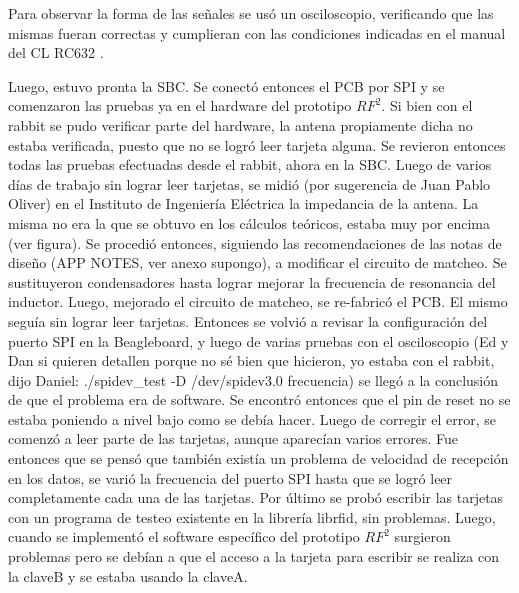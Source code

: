 Para observar la forma de las señales se usó un osciloscopio, verificando que las mismas fueran correctas y cumplieran con las condiciones indicadas en el manual del CL RC632 .

Luego, estuvo pronta la SBC. Se conectó entonces el PCB por SPI y se comenzaron las pruebas ya en el hardware del prototipo ${RF^{2}}$. Si bien con el rabbit se pudo verificar parte del hardware, la antena propiamente dicha no estaba verificada, puesto que no se logró leer tarjeta alguna.
Se revieron entonces todas las pruebas efectuadas desde el rabbit, ahora en la SBC. Luego de varios días de trabajo sin lograr leer tarjetas, se midió (por sugerencia de Juan Pablo Oliver) en el Instituto de Ingeniería Eléctrica la impedancia de la antena. La misma no era la que se obtuvo en los cálculos teóricos, estaba muy por encima (ver figura). Se procedió entonces, siguiendo las recomendaciones de las notas de diseño (APP NOTES, ver anexo supongo), a modificar el circuito de matcheo. Se sustituyeron condensadores hasta lograr mejorar la frecuencia de resonancia del inductor.
Luego, mejorado el circuito de matcheo, se re-fabricó el PCB. El mismo seguía sin lograr leer tarjetas. Entonces se volvió a revisar la configuración del puerto SPI en la Beagleboard, y luego de varias pruebas con el osciloscopio (Ed y Dan si quieren detallen porque no sé bien que hicieron, yo estaba con el rabbit, dijo Daniel:  ./spidev\_test -D /dev/spidev3.0 frecuencia) se llegó a la conclusión de que el problema era de software. Se encontró entonces que el pin de reset no se estaba poniendo a nivel bajo como se debía hacer. Luego de corregir el error, se comenzó a leer parte de las tarjetas, aunque aparecían varios errores. Fue entonces que se pensó que también existía un problema de velocidad de recepción en los datos, se varió la frecuencia del puerto SPI hasta que se logró leer completamente cada una de las tarjetas.
Por último se probó escribir las tarjetas con un programa de testeo existente en la librería librfid, sin problemas. Luego, cuando se implementó el software específico del prototipo ${RF^{2}}$ surgieron problemas pero se debían a que el acceso a la tarjeta para escribir se realiza con la claveB y se estaba usando la claveA.